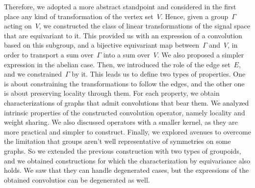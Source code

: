 Therefore, we adopted a more abstract standpoint and considered in the first place any kind of transformation of the vertex set~$V$. Hence, given a group~$\Gamma$ acting on~$V$, we constructed the class of linear transformations of the signal space that are equivariant to it. This provided us with an expression of a convolution based on this subgroup, and a bijective equivariant map between~$\Gamma$ and~$V$, in order to transport a sum over~$\Gamma$ into a sum over~$V$. We also proposed a simpler expression in the abelian case.
Then, we introduced the role of the edge set~$E$, and we constrained~$\Gamma$ by it. This leads us to define two types of properties. One is about constraining the transformations to follow the edges, and the other one is about preserving locality through them. For each property, we obtain characterizations of graphs that admit convolutions that bear them. We analyzed intrinsic properties of the constructed convolution operator, namely locality and weight sharing. We also discussed operators with a smaller kernel, as they are more practical and simpler to construct.
Finally, we explored avenues to overcome the limitation that groups aren't well representative of symmetries on some graphs. So we extended the previous construction with two types of groupoids, and we obtained constructions for which the characterization by equivariance also holds. We saw that they can handle degenerated cases, but the expressions of the obtained convolutios can be degenerated as well.



